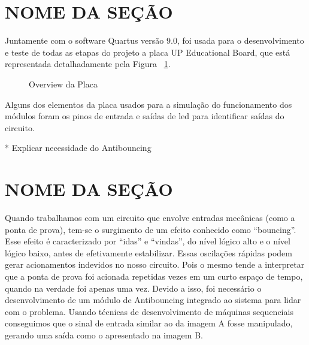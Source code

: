 \documentclass[12pt,a4paper,openany]{abntex2}
\begin{document}
\section{NOME DA SEÇÃO}

  Juntamente com o software Quartus versão 9.0, foi usada para o desenvolvimento e teste
de todas as etapas do projeto a placa UP Educational Board, que está representada
detalhadamente pela Figura ~\ref{fig:placa-1}.

\begin{figure}[!htp]
	\centering
		\caption{Overview da Placa}
	\label{fig:placa-1}
\end{figure}

  Alguns dos elementos da placa usados para a simulação do funcionamento dos módulos
foram os pinos de entrada e saídas de led para identificar saídas do circuito.

* Explicar necessidade do Antibouncing
\section{NOME DA SEÇÃO}

  Quando trabalhamos com um circuito que envolve entradas mecânicas (como a ponta de prova),
tem-se o surgimento de um efeito conhecido como “bouncing”.
  Esse efeito é caracterizado por “idas” e “vindas”, do nível lógico alto e o nível
lógico baixo, antes de efetivamente estabilizar. Essas oscilações rápidas podem
gerar acionamentos indevidos no nosso circuito. Pois o mesmo tende a interpretar
que a ponta de prova foi acionada repetidas vezes em um curto espaço de tempo,
quando na verdade foi apenas uma vez.
  Devido a isso, foi necessário o desenvolvimento de um módulo de Antibouncing
integrado ao sistema para lidar com o problema. Usando técnicas de desenvolvimento
de máquinas sequenciais conseguimos que o sinal de entrada similar ao da imagem A
fosse manipulado, gerando uma saída como o apresentado na imagem B.
\end{document}
